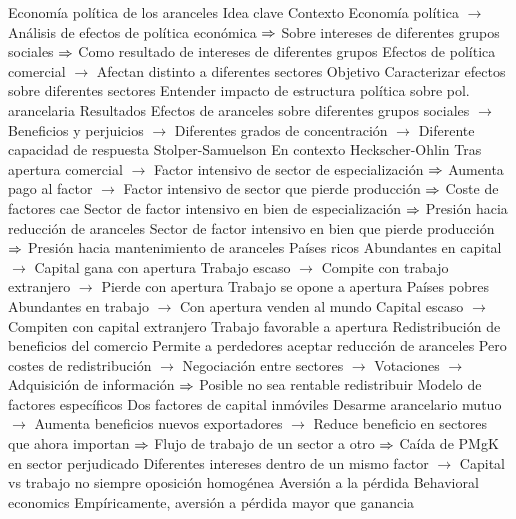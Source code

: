 \documentclass{nuevotema}
\begin{document}
\begin{esquemal}
		\2 Economía política de los aranceles
			\3 Idea clave
				\4 Contexto
				\4[] Economía política
				\4[] $\to$ Análisis de efectos de política económica
				\4[] $\then$ Sobre intereses de diferentes grupos sociales
				\4[] $\then$ Como resultado de intereses de diferentes grupos
				\4[] Efectos de política comercial
				\4[] $\to$ Afectan distinto a diferentes sectores
				\4 Objetivo
				\4[] Caracterizar efectos sobre diferentes sectores
				\4[] Entender impacto de estructura política sobre pol. arancelaria
				\4 Resultados
				\4[] Efectos de aranceles sobre diferentes grupos sociales
				\4[] $\to$ Beneficios y perjuicios
				\4[] $\to$ Diferentes grados de concentración
				\4[] $\to$ Diferente capacidad de respuesta
			\3 Stolper-Samuelson
				\4 En contexto Heckscher-Ohlin
				\4 Tras apertura comercial
				\4[] $\to$ Factor intensivo de sector de especialización
				\4[] $\then$ Aumenta pago al factor
				\4[] $\to$ Factor intensivo de sector que pierde producción
				\4[] $\then$ Coste de factores cae
				\4 Sector de factor intensivo en bien de especialización
				\4[] $\then$ Presión hacia reducción de aranceles
				\4 Sector de factor intensivo en bien que pierde producción
				\4[] $\then$ Presión hacia mantenimiento de aranceles
				\4 Países ricos
				\4[] Abundantes en capital
				\4[] $\to$ Capital gana con apertura
				\4[] Trabajo escaso
				\4[] $\to$ Compite con trabajo extranjero
				\4[] $\to$ Pierde con apertura
				\4[$\then$] Trabajo se opone a apertura
				\4 Países pobres
				\4[] Abundantes en trabajo
				\4[] $\to$ Con apertura venden al mundo
				\4[] Capital escaso
				\4[] $\to$ Compiten con capital extranjero
				\4[$\then$] Trabajo favorable a apertura
			\3 Redistribución de beneficios del comercio
				\4 Permite a perdedores aceptar reducción de aranceles
				\4 Pero costes de redistribución
				\4[] $\to$ Negociación entre sectores
				\4[] $\to$ Votaciones
				\4[] $\to$ Adquisición de información
				\4[] $\then$ Posible no sea rentable redistribuir
			\3 Modelo de factores específicos
				\4 Dos factores de capital inmóviles
				\4 Desarme arancelario mutuo
				\4[] $\to$ Aumenta beneficios nuevos exportadores
				\4[] $\to$ Reduce beneficio en sectores que ahora importan
				\4[] $\then$ Flujo de trabajo de un sector a otro
				\4[] $\then$ Caída de PMgK en sector perjudicado
				\4[] Diferentes intereses dentro de un mismo factor
				\4[] $\to$ Capital vs trabajo no siempre oposición homogénea
			\3 Aversión a la pérdida
				\4 Behavioral economics
				\4[] Empíricamente, aversión a pérdida mayor que ganancia

\end{esquemal}
\end{document}
